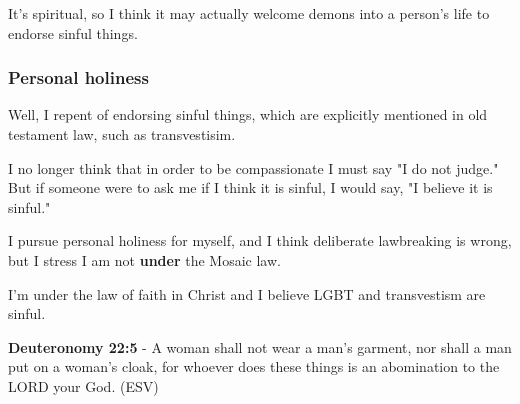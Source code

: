\documentclass[11pt]{article}
\begin{document}
It's spiritual, so I think it may actually
welcome demons into a person's life to endorse
sinful things.

\subsubsection{Personal holiness}
\label{sec:orgf17deff}
Well, I repent of endorsing sinful things,
which are explicitly mentioned in old
testament law, such as transvestisim.

I no longer think that in order to be compassionate I must say "I do not judge."
But if someone were to ask me if I think it is sinful, I would say, "I believe it is sinful."

I pursue personal holiness for myself, and I
think deliberate lawbreaking is wrong,
but I stress I am not \textbf{under} the Mosaic law.

I'm under the law of faith in Christ and I believe
LGBT and transvestism are sinful.

\textbf{Deuteronomy 22:5} - A woman shall not wear a man's garment, nor shall a man put on a woman's cloak, for whoever does these things is an abomination to the LORD your God. (ESV)
\end{document}
